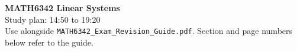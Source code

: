 \documentclass[11pt,a4paper]{article}
\begin{document}
\begin{center}
{\LARGE\bfseries\color{navy}MATH6342 Linear Systems}\\[4pt]
{\Large Study plan: 14:50 to 19:20}\\[4pt]
{\color{teal}Use alongside \texttt{MATH6342\_Exam\_Revision\_Guide.pdf}. Section and page numbers below refer to the guide.}
\end{center}

\end{document}

